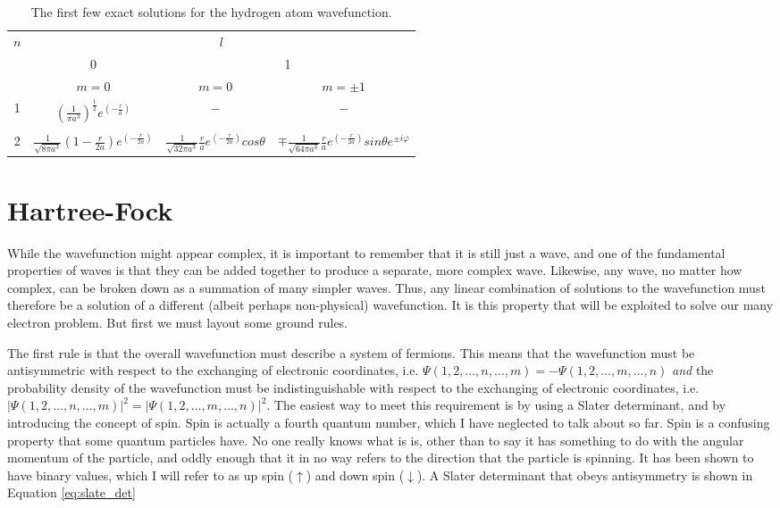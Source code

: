 \begin{table}[h!]
\caption{The first few exact solutions for the hydrogen atom wavefunction.}
\label{tab:hsol}
\centering
\begin{tabular}{cccc}
\toprule
$n$	&	\multicolumn{3}{c}{$l$}	\\
\cmidrule(lr){1-1} \cmidrule(lr){2-4}
				&	0		&	\multicolumn{2}{c}{1}	\\ 
					\cmidrule(lr){2-2} \cmidrule(lr){3-4}
				&	$m=0$	&	$m=0$	&	$m=\pm1$	\\
\midrule
1	&	$\displaystyle\left(\frac{1}{\pi a^{3}}\right)^{\frac{1}{2}}e^{\left(-\frac{r}{a}\right)}$			&	$-$	&	$-$	\\
\\
2	&	$\displaystyle\frac{1}{\sqrt{8\pi a^{3}}}\left(1-\frac{r}{2a}\right)e^{\left(-\frac{r}{2a}\right)}$	&	$\displaystyle\frac{1}{\sqrt{32\pi a^{3}}}\frac{r}{a}e^{\left(-\frac{r}{2a}\right)}cos\theta $	&	
$\displaystyle\mp\frac{1}{\sqrt{64\pi a^{3}}}\frac{r}{a}e^{\left(-\frac{r}{2a}\right)}sin\theta e^{\pm i \varphi}$	\\
\bottomrule
\end{tabular}
\end{table}

\section{Hartree-Fock}
\label{sec:hartree_fock}
While the wavefunction might appear complex, it is important to remember that it is still just a wave, and one of the fundamental properties of waves is that they can be added together to produce a separate, more complex wave. Likewise, any wave, no matter how complex, can be broken down as a summation of many simpler waves\cite{fourier1822thorie}. Thus, any linear combination of solutions to the wavefunction must therefore be a solution of a different (albeit perhaps non-physical) wavefunction. It is this property that will be exploited to solve our many electron problem. But first we must layout some ground rules.

The first rule is that the overall wavefunction must describe a system of fermions. This means that the wavefunction must be antisymmetric with respect to the exchanging of electronic coordinates, i.e. $\Psi(1, 2,\ldots, n,\ldots,m) = -\Psi(1, 2,\ldots, m,\ldots,n)$ \textit{and} the probability density of the wavefunction must be indistinguishable with respect to the exchanging of electronic coordinates, i.e. $|\Psi(1, 2,\ldots, n,\ldots,m)|^{2} = |\Psi(1, 2,\ldots, m,\ldots,n)|^{2}$. The easiest way to meet this requirement is by using a Slater determinant\cite{PhysRev.34.1293}, and by introducing the concept of spin. Spin is actually a fourth quantum number, which I have neglected to talk about so far. Spin is a confusing property that some quantum particles have. No one really knows what is is, other than to say it has something to do with the angular momentum of the particle, and oddly enough that it in no way refers to the direction that the particle is spinning. It has been shown to have binary values\cite{Gerlach1922}, which I will refer to as up spin ($\uparrow$) and down spin ($\downarrow$). A Slater determinant that obeys antisymmetry is shown in Equation \ref{eq:slate_det}

